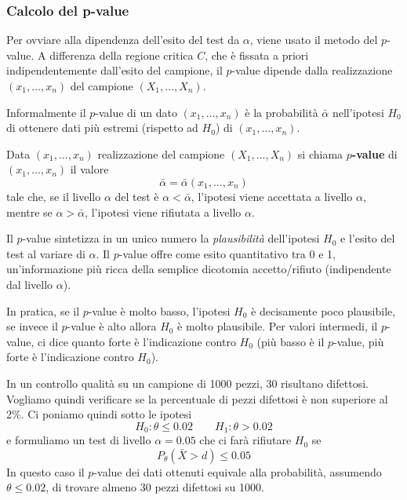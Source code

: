 \subsubsection{Calcolo del p-value}
Per ovviare alla dipendenza dell'esito del test da $\alpha$, viene usato il metodo del $p$-value.
A differenza della regione critica $C$, che è fissata a priori indipendentemente dall'esito del
campione, il $p$-value dipende dalla realizzazione $(x_1, \dots, x_n)$ del campione
$(X_1, \dots, X_n)$.

Informalmente il $p$-value di un dato $(x_1, \dots, x_n)$ è la probabilità $\bar{\alpha}$
nell'ipotesi $H_0$ di ottenere dati più estremi (rispetto ad $H_0$) di $(x_1, \dots, x_n)$.

\begin{definition}
	Data $(x_1, \dots, x_n)$ realizzazione del campione $(X_1, \dots, X_n)$ si chiama
	\textbf{$p$-value} di $(x_1, \dots, x_n)$ il valore
	\[ \bar{\alpha} = \bar{\alpha} (x_1, \dots, x_n) \]
	tale che, se il livello $\alpha$ del test è $\alpha < \bar{\alpha}$, l'ipotesi viene accettata
	a livello $\alpha$, mentre se $\alpha > \bar{\alpha}$, l'ipotesi viene rifiutata a livello
	$\alpha$.
\end{definition}

Il $p$-value sintetizza in un unico numero la \emph{plausibilità} dell'ipotesi $H_0$ e l'esito del
test al variare di $\alpha$. Il $p$-value offre come esito quantitativo tra 0 e 1, un'informazione
più ricca della semplice dicotomia accetto/rifiuto (indipendente dal livello $\alpha$).

In pratica, se il $p$-value è molto basso, l'ipotesi $H_0$ è decisamente poco plausibile, se invece
il $p$-value è alto allora $H_0$ è molto plausibile. Per valori intermedi, il $p$-value, ci dice
quanto forte è l'indicazione contro $H_0$ (più basso è il $p$-value, più forte è l'indicazione
contro $H_0$).

\begin{example}
	In un controllo qualità su un campione di 1000 pezzi, 30 risultano difettosi. Vogliamo quindi
	verificare se la percentuale di pezzi difettosi è non superiore al 2\%. Ci poniamo quindi sotto
	le ipotesi
	\[ H_0 : \theta \leq 0.02 \qquad H_1 : \theta > 0.02 \]
	e formuliamo un test di livello $\alpha = 0.05$ che ci farà rifiutare $H_0$ se
	\[ P_\theta (\bar{X} > d) \leq 0.05 \]
	In questo caso il $p$-value dei dati ottenuti equivale alla probabilità, assumendo
	$\theta \leq 0.02$, di trovare almeno 30 pezzi difettosi su 1000.
\end{example}